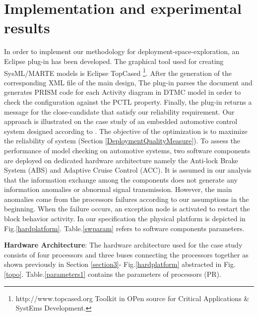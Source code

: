 \documentclass[3p,times,procedia,authoryear,round]{elsarticle}
\begin{document}
\section{Implementation and experimental results}
\label{section8}
In order to implement our methodology for deployment-space-exploration, an Eclipse plug-in has been developed. The graphical tool used for creating SysML/MARTE models is Eclipse TopCased \footnote{http://www.topcased.org Toolkit in OPen source for Critical Applications \& SystEms Development.}. After the generation of the corresponding XML file of the main design, The plug-in parses the document and generates PRISM code for each Activity diagram in DTMC model in order to check the configuration against the PCTL property. Finally, the plug-in returns a message for the close-candidate that satisfy our reliability requirement. 
Our approach is illustrated on the case study of an embedded automotive control system designed according to \citep{Meedeniya2011835}. The objective of the optimization is to maximize the reliability of system (Section \ref{DeploymentQualityMeasure}). To assess the performance of model checking on automotive systems, two software components are deployed on dedicated hardware architecture namely the Anti-lock Brake System (ABS) and Adaptive Cruise Control (ACC). It is assumed in our analysis that the information exchange among the components does not generate any information anomalies or abnormal signal transmission. However, the main anomalies come from the processors failures according to our assumptions in the beginning. When the failure occurs, an exception node is activated to restart the block behavior activity. In our specification the physical platform is depicted in Fig.\ref{hardplatform}. Table.\ref{swparam} refers to software components parameters.


\textbf{Hardware Architecture}: The hardware architecture used for the case study consists of four processors and three buses connecting the processors together as shown previously in Section \ref{section3}- Fig.\ref{hardplatform} abstracted in Fig.\ref{topo}. Table.\ref{parameters1} contains the parameters of processors (PR). 
\end{document}
